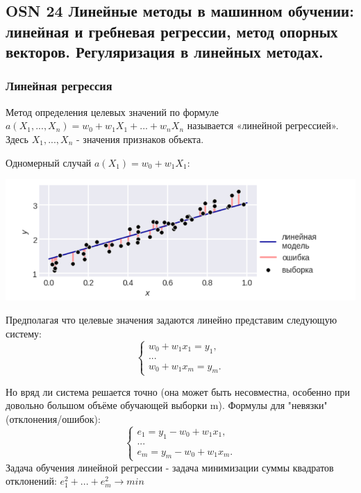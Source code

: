 \subsection{OSN 24 Линейные методы в машинном обучении: линейная и гребневая регрессии, метод опорных векторов. Регуляризация в линейных методах.}

\subsubsection{Линейная регрессия}
Метод определения целевых значений по формуле $a(X_1, ..., X_n) = w_0 + w_1X_1 + ... + w_nX_n$ называется «линейной регрессией». Здесь $X_1, ..., X_n$ - значения признаков объекта.

Одномерный случай $a(X_1) = w_0 + w_1X_1$:

\includegraphics[scale=0.4]{pics/ml2_lin1.png}

Предполагая что целевые значения задаются линейно представим следующую систему:
\begin{equation*}
 \begin{cases}
   w_0 + w_1x_1 = y_1,
   \\
   ...
   \\
   w_0 + w_1x_m = y_m.
 \end{cases}
\end{equation*}

Но вряд ли система решается точно (она может быть несовместна, особенно при довольно большом объёме обучающей выборки m).
Формулы для "невязки" (отклонения/ошибок):
\begin{equation*}
 \begin{cases}
   e_1 = y_1 - w_0 + w_1x_1,
   \\
   ...
   \\
   e_m = y_m - w_0 + w_1x_m.
 \end{cases}
\end{equation*}
Задача обучения линейной регрессии - задача минимизации суммы квадратов
отклонений:
$e_1^2 + ... + e_m^2 \rightarrow min$

